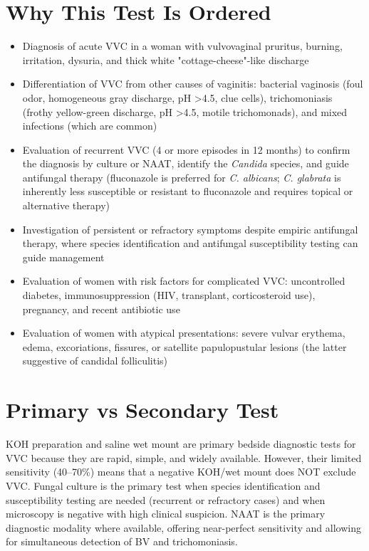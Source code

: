 \section*{Why This Test Is Ordered}
\begin{itemize}
  \item Diagnosis of acute VVC in a woman with vulvovaginal pruritus, burning, irritation, dysuria, and thick white "cottage-cheese"-like discharge
  \item Differentiation of VVC from other causes of vaginitis: bacterial vaginosis (foul odor, homogeneous gray discharge, pH >4.5, clue cells), trichomoniasis (frothy yellow-green discharge, pH >4.5, motile trichomonads), and mixed infections (which are common)
  \item Evaluation of recurrent VVC (4 or more episodes in 12 months) to confirm the diagnosis by culture or NAAT, identify the \textit{Candida} species, and guide antifungal therapy (fluconazole is preferred for \textit{C. albicans}; \textit{C. glabrata} is inherently less susceptible or resistant to fluconazole and requires topical or alternative therapy)
  \item Investigation of persistent or refractory symptoms despite empiric antifungal therapy, where species identification and antifungal susceptibility testing can guide management
  \item Evaluation of women with risk factors for complicated VVC: uncontrolled diabetes, immunosuppression (HIV, transplant, corticosteroid use), pregnancy, and recent antibiotic use
  \item Evaluation of women with atypical presentations: severe vulvar erythema, edema, excoriations, fissures, or satellite papulopustular lesions (the latter suggestive of candidal folliculitis)
\end{itemize}

\section*{Primary vs Secondary Test}
KOH preparation and saline wet mount are primary bedside diagnostic tests for VVC because they are rapid, simple, and widely available. However, their limited sensitivity (40--70\%) means that a negative KOH/wet mount does NOT exclude VVC. Fungal culture is the primary test when species identification and susceptibility testing are needed (recurrent or refractory cases) and when microscopy is negative with high clinical suspicion. NAAT is the primary diagnostic modality where available, offering near-perfect sensitivity and allowing for simultaneous detection of BV and trichomoniasis.

